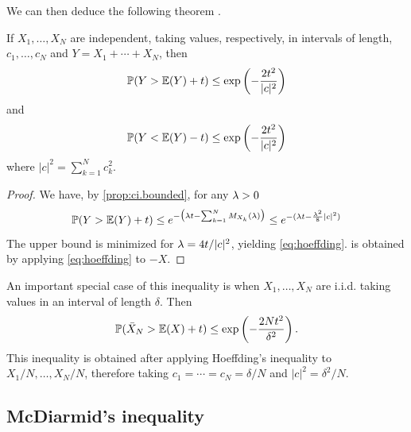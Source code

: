 We can then deduce the following theorem \citep{hoeffding1994probability}. 
\begin{corollary}
\label{coro:hoeffding}
If $X_1, \ldots, X_N$ are independent, taking values, respectively, in intervals of length, $c_1, \ldots, c_N$  and
$Y = X_1 + \cdots + X_N$, then
\begin{equation}
\label{eq:hoeffding}
\bm{\mathbb P}(Y > \bm{\mathbb E}(Y)+ t) \leq \exp\left(-\frac{2t^2}{|c|^2}\right)
\end{equation}
and
\begin{equation}
\label{eq:hoeffding.sym}
\bm{\mathbb P}(Y < \bm{\mathbb E}(Y)- t) \leq \exp\left(-\frac{2t^2}{|c|^2}\right)
\end{equation}
where $|c|^2 = \sum_{k=1}^N c_k^2$. 
\end{corollary}
\begin{proof}
We have, by  \cref{prop:ci.bounded}, for any $\lambda>0$
\[
\bm{\mathbb P}(Y > \bm{\mathbb E}(Y) + t) \leq e^{- \big(\lambda t -\sum_{k=1}^N M_{X_k}(\lambda )\big)} \leq e^{-(\lambda t -\frac{\lambda^2}8 |c|^2)}
\]
The upper bound is minimized for $\lambda = 4t/|c|^2$, yielding \cref{eq:hoeffding}.   is obtained by applying \cref{eq:hoeffding} to $-X$.
\end{proof}

An important special case of this inequality is when $X_1, \ldots, X_N$ are i.i.d. taking values in an interval of length $\delta$. Then
\begin{equation}
\label{eq:hoeffding.2}
\bm{\mathbb P}(\bar X_N > \bm{\mathbb E}(X)+ t) \leq \exp\left(-\frac{2Nt^2}{\delta^2}\right).
\end{equation}
This inequality is obtained after applying Hoeffding's inequality to $X_1/N, \ldots, X_N/N$, therefore taking $c_1=\cdots=c_N = \delta/N$ and $|c|^2 = \delta^2/N$.


\subsection{McDiarmid's inequality}

